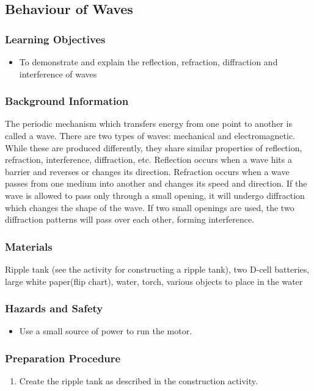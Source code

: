 \subsection{Behaviour of Waves}

\subsubsection*{Learning Objectives}
\begin{itemize}
\item{To demonstrate and explain the reflection, refraction, diffraction and interference of waves} 
\end{itemize}

\subsubsection*{Background Information}
The periodic mechanism which transfers energy from one point to another is called a wave.  There are two types of waves: mechanical and electromagnetic.  While these are produced differently, they share similar properties of reflection, refraction, interference, diffraction, etc.  Reflection occurs when a wave hits a barrier and reverses or changes its direction.  Refraction occurs when a wave passes from one medium into another and changes its speed and direction.  If the wave is allowed to pass only through a small opening, it will undergo diffraction which changes the shape of the wave.  If two small openings are used, the two diffraction patterns will pass over each other, forming interference.

\subsubsection*{Materials}
Ripple tank (see the activity for constructing a ripple tank), two D-cell batteries, large white paper(flip chart), water, torch, various objects to place in the water

\subsubsection*{Hazards and Safety}
\begin{itemize}
\item{Use a small source of power to run the motor.} 
\end{itemize}

\subsubsection*{Preparation Procedure}
\begin{enumerate}
\item{Create the ripple tank as described in the construction activity.} 
\end{enumerate}

